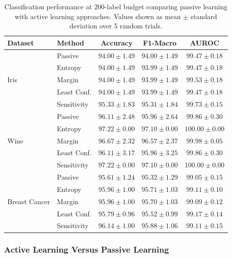 \documentclass[conference]{IEEEtran}
\begin{document}
\begin{table}[t]
\centering
\caption{Classification performance at 200-label budget comparing passive learning with active learning approaches. Values shown as mean $\pm$ standard deviation over 5 random trials.}
\label{tab:cls-results}
\begin{tabular}{llccc}
\toprule
Dataset & Method & Accuracy & F1-Macro & AUROC \\
\midrule
\multirow{5}{*}{Iris} & Passive & $94.00 \pm 1.49$ & $94.00 \pm 1.49$ & $99.47 \pm 0.18$ \\
 & Entropy & $94.00 \pm 1.49$ & $93.99 \pm 1.49$ & $99.47 \pm 0.18$ \\
 & Margin & $94.00 \pm 1.49$ & $93.99 \pm 1.49$ & $99.53 \pm 0.18$ \\
 & Least Conf. & $94.00 \pm 1.49$ & $93.99 \pm 1.49$ & $99.47 \pm 0.18$ \\
 & Sensitivity & $\mathbf{95.33 \pm 1.83}$ & $\mathbf{95.31 \pm 1.84}$ & $\mathbf{99.73 \pm 0.15}$ \\
\midrule
\multirow{5}{*}{Wine} & Passive & $96.11 \pm 2.48$ & $95.96 \pm 2.64$ & $99.86 \pm 0.30$ \\
 & Entropy & $\mathbf{97.22 \pm 0.00}$ & $\mathbf{97.10 \pm 0.00}$ & $\mathbf{100.00 \pm 0.00}$ \\
 & Margin & $96.67 \pm 2.32$ & $96.57 \pm 2.37$ & $99.98 \pm 0.05$ \\
 & Least Conf. & $96.11 \pm 3.17$ & $95.96 \pm 3.25$ & $99.86 \pm 0.30$ \\
 & Sensitivity & $\mathbf{97.22 \pm 0.00}$ & $\mathbf{97.10 \pm 0.00}$ & $\mathbf{100.00 \pm 0.00}$ \\
\midrule
\multirow{5}{*}{Breast Cancer} & Passive & $95.61 \pm 1.24$ & $95.32 \pm 1.29$ & $99.05 \pm 0.15$ \\
 & Entropy & $95.96 \pm 1.00$ & $95.71 \pm 1.03$ & $99.11 \pm 0.10$ \\
 & Margin & $95.96 \pm 1.00$ & $95.70 \pm 1.03$ & $99.09 \pm 0.12$ \\
 & Least Conf. & $95.79 \pm 0.96$ & $95.52 \pm 0.99$ & $99.17 \pm 0.14$ \\
 & Sensitivity & $\mathbf{96.14 \pm 1.00}$ & $\mathbf{95.88 \pm 1.06}$ & $\mathbf{99.11 \pm 0.15}$ \\
\bottomrule
\end{tabular}
\end{table}

\subsubsection{Active Learning Versus Passive Learning}
\end{document}
